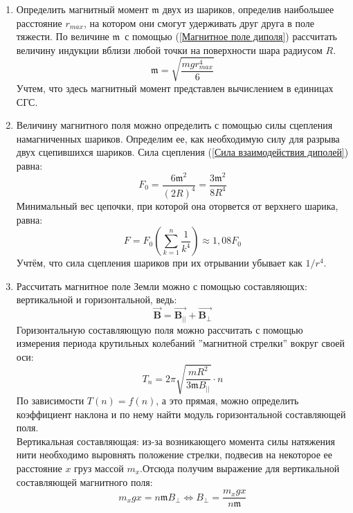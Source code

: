 \documentclass[a4paper, 10pt]{article}
\begin{document}
\begin{enumerate}
    \item Определить магнитный момент $\mathfrak{m}$ двух из шариков, определив наибольшее расстояние $\mathit{r_{max}}$, на котором они смогут удерживать друг друга в поле тяжести. По величине $\mathfrak{m}$\
    с помощью (\ref{Магнитное поле диполя}) рассчитать величину индукции вблизи любой точки на поверхности шара радиусом $\mathit{R}$.
    \begin{equation}
        \mathfrak{m} = \sqrt{\frac{mgr_{max}^{4}}{6}}
        \label{Магнитный момент}
    \end{equation}
    Учтем, что здесь магнитный момент представлен вычислением в единицах СГС.
    \item Величину магнитного поля можно определить с помощью силы сцепления намагниченных шариков. Определим ее, как необходимую силу для разрыва двух сцепившихся шариков. Сила сцепления (\ref{Сила взаимодействия диполей}) равна:
    \begin{equation}
        F_{0} = \frac{6\mathfrak{m}^{2}}{(2R)^{4}} = \frac{3\mathfrak{m}^2}{8R^{4}}
        \label{Сила сцепления}
    \end{equation}
    Минимальный вес цепочки, при которой она оторвется от верхнего шарика, равна:
    \begin{equation}
        F = F_{0}\left(\sum_{k = 1}^n \frac{1}{k^{4}}\right) \approx 1,08F_{0}
        \label{Вес цепочки}
    \end{equation}
    Учтём, что сила сцепления шариков при их отрывании убывает как $1/r^{4}$.
    \item Рассчитать магнитное поле Земли можно с помощью составляющих: вертикальной и горизонтальной, ведь:
    \begin{equation}
        \vec{\mathbf{B}} = \vec{\mathbf{B_{||}}} + \vec{\mathbf{B_{\perp}}}
        \label{Векторная сумма полей}
    \end{equation}
    Горизонтальную составляющую поля можно рассчитать с помощью измерения периода крутильных колебаний ''магнитной стрелки'' вокруг своей оси:
    \begin{equation}
        T_{n} = 2\pi \sqrt{\frac{mR^{2}}{3\mathfrak{m}B_{||}}}\cdot n
        \label{Период крутильных колебаний}
    \end{equation}
    По зависимости $T(n) = f(n)$, а это прямая, можно определить коэффициент наклона и по нему найти модуль горизонтальной составляющей поля.\\
    Вертикальная составляющая: из-за возникающего момента силы натяжения нити необходимо
    выровнять положение стрелки, подвесив на некоторое ее расстояние $x$ груз массой $m_{x}$.Отсюда получим выражение для вертикальной составляющей магнитного поля:
    \begin{equation}
        m_{x}gx = n\mathfrak{m}B_{\perp} \iff B_{\perp} = \frac{m_{x}gx}{n\mathfrak{m}}
        \label{Вертикальная составляющая}
    \end{equation}
\end{enumerate}
\end{document}
